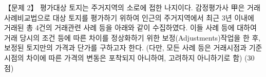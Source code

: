 \begin{longquestion}{【문제 2】}
평가대상 토지는 주거지역의 소로에 접한 나지이다. 감정평가사 甲은 거래사례비교법으로 대상 토지를 평가하기 위하여 인근의 주거지역에서 최근 3년 이내에 거래된 총 4건의 거래관련 사례 등을 아래와 같이 수집하였다. 이들 사례 등에 대하여 거래 당시의 조건 등에 따른 차이를 정상화하기 위한 보정(Adjustments)작업을 한 후, 보정된 토지만의 가격과 단가를 구하고자 한다. (다만, 모든 사례 등은 거래시점과 기준시점의 차이에 따른 가격의 변동은 포착되지 아니하여, 고려하지 아니하기로 함) (30점) \par
{\small\centering\renewcommand{\arraystretch}{1.25}
\par}


\end{longquestion}
